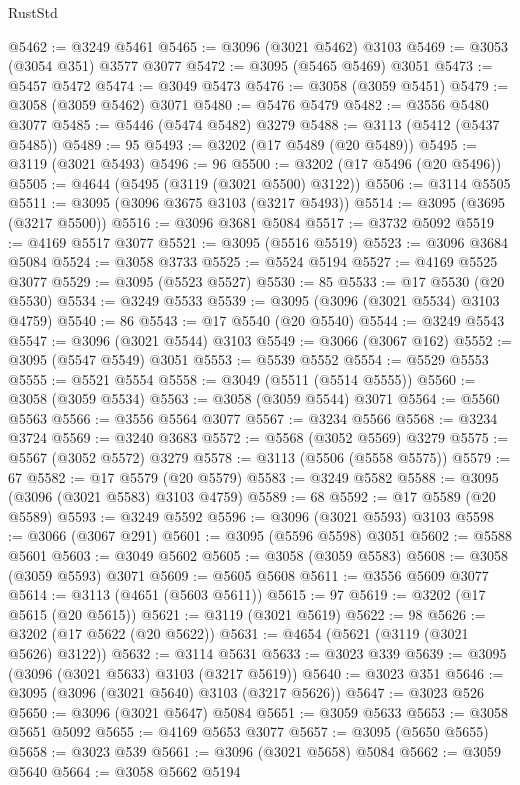 \begin{lexlean}{RustStd}
\begin{coremodule}
@5462 := @3249 @5461
@5465 := @3096 (@3021 @5462) @3103
@5469 := @3053 (@3054 @351) @3577 @3077
@5472 := @3095 (@5465 @5469) @3051
@5473 := @5457 @5472
@5474 := @3049 @5473
@5476 := @3058 (@3059 @5451)
@5479 := @3058 (@3059 @5462) @3071
@5480 := @5476 @5479
@5482 := @3556 @5480 @3077
@5485 := @5446 (@5474 @5482) @3279
@5488 := @3113 (@5412 (@5437 @5485))
@5489 := 95
@5493 := @3202 (@17 @5489 (@20 @5489))
@5495 := @3119 (@3021 @5493)
@5496 := 96
@5500 := @3202 (@17 @5496 (@20 @5496))
@5505 := @4644 (@5495 (@3119 (@3021 @5500) @3122))
@5506 := @3114 @5505
@5511 := @3095 (@3096 @3675 @3103 (@3217 @5493))
@5514 := @3095 (@3695 (@3217 @5500))
@5516 := @3096 @3681 @5084
@5517 := @3732 @5092
@5519 := @4169 @5517 @3077
@5521 := @3095 (@5516 @5519)
@5523 := @3096 @3684 @5084
@5524 := @3058 @3733
@5525 := @5524 @5194
@5527 := @4169 @5525 @3077
@5529 := @3095 (@5523 @5527)
@5530 := 85
@5533 := @17 @5530 (@20 @5530)
@5534 := @3249 @5533
@5539 := @3095 (@3096 (@3021 @5534) @3103 @4759)
@5540 := 86
@5543 := @17 @5540 (@20 @5540)
@5544 := @3249 @5543
@5547 := @3096 (@3021 @5544) @3103
@5549 := @3066 (@3067 @162)
@5552 := @3095 (@5547 @5549) @3051
@5553 := @5539 @5552
@5554 := @5529 @5553
@5555 := @5521 @5554
@5558 := @3049 (@5511 (@5514 @5555))
@5560 := @3058 (@3059 @5534)
@5563 := @3058 (@3059 @5544) @3071
@5564 := @5560 @5563
@5566 := @3556 @5564 @3077
@5567 := @3234 @5566
@5568 := @3234 @3724
@5569 := @3240 @3683
@5572 := @5568 (@3052 @5569) @3279
@5575 := @5567 (@3052 @5572) @3279
@5578 := @3113 (@5506 (@5558 @5575))
@5579 := 67
@5582 := @17 @5579 (@20 @5579)
@5583 := @3249 @5582
@5588 := @3095 (@3096 (@3021 @5583) @3103 @4759)
@5589 := 68
@5592 := @17 @5589 (@20 @5589)
@5593 := @3249 @5592
@5596 := @3096 (@3021 @5593) @3103
@5598 := @3066 (@3067 @291)
@5601 := @3095 (@5596 @5598) @3051
@5602 := @5588 @5601
@5603 := @3049 @5602
@5605 := @3058 (@3059 @5583)
@5608 := @3058 (@3059 @5593) @3071
@5609 := @5605 @5608
@5611 := @3556 @5609 @3077
@5614 := @3113 (@4651 (@5603 @5611))
@5615 := 97
@5619 := @3202 (@17 @5615 (@20 @5615))
@5621 := @3119 (@3021 @5619)
@5622 := 98
@5626 := @3202 (@17 @5622 (@20 @5622))
@5631 := @4654 (@5621 (@3119 (@3021 @5626) @3122))
@5632 := @3114 @5631
@5633 := @3023 @339
@5639 := @3095 (@3096 (@3021 @5633) @3103 (@3217 @5619))
@5640 := @3023 @351
@5646 := @3095 (@3096 (@3021 @5640) @3103 (@3217 @5626))
@5647 := @3023 @526
@5650 := @3096 (@3021 @5647) @5084
@5651 := @3059 @5633
@5653 := @3058 @5651 @5092
@5655 := @4169 @5653 @3077
@5657 := @3095 (@5650 @5655)
@5658 := @3023 @539
@5661 := @3096 (@3021 @5658) @5084
@5662 := @3059 @5640
@5664 := @3058 @5662 @5194

\end{coremodule}
\end{lexlean}
